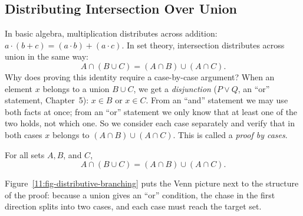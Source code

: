 \subsection{Distributing Intersection Over Union}

In basic algebra, multiplication distributes across addition: $a \cdot (b + c) = (a \cdot b) + (a \cdot c)$. In set theory, intersection distributes across union in the same way:
\[
A \cap (B \cup C) = (A \cap B) \cup (A \cap C).
\]
Why does proving this identity require a case-by-case argument? When an element $x$ belongs to a union $B \cup C$, we get a \emph{disjunction} ($P \lor Q$, an ``or'' statement, Chapter~5): $x \in B$ or $x \in C$. From an ``and'' statement we may use both facts at once; from an ``or'' statement we only know that at least one of the two holds, not which one. So we consider each case separately and verify that in both cases $x$ belongs to $(A \cap B) \cup (A \cap C)$. This is called a \emph{proof by cases}.

\begin{theorem}
For all sets $A, B$, and $C$,
\[
A \cap (B \cup C) = (A \cap B) \cup (A \cap C).
\]
\end{theorem}

Figure~\ref{11:fig-distributive-branching} puts the Venn picture next to the structure of the proof: because a union gives an ``or'' condition, the chase in the first direction splits into two cases, and each case must reach the target set.

